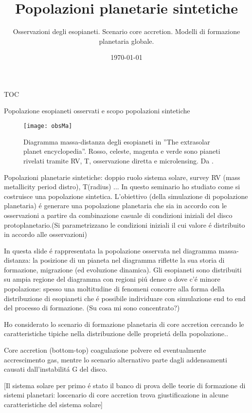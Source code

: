 \documentclass[10pt,xcolor={usenames},fleqn,serif]{beamer}
\title{Popolazioni planetarie sintetiche}
\subtitle{Osservazioni degli esopianeti. Scenario core accretion. Modelli di formazione planetaria globale.}
\date{\today}
\begin{document}
\begin{frame}
  \titlepage
\end{frame}

\begin{frame}{TOC}
\tableofcontents[onlyparts]
\end{frame}

\begin{frame}[label={intro}]{Popolazione esopianeti osservati e scopo popolazioni sintetiche}
\begin{figure}[!ht]
	\texttt{[image: obsMa]}
	\caption{Diagramma massa-distanza degli esopianeti in ''The extrasolar planet encyclopedia''. Rosso, celeste, magenta e verde sono pianeti rivelati tramite RV, T, osservazione diretta e microlensing. Da \cite{mordasini2018planetary}.}\label{fig:Maplot}
\end{figure}
\end{frame}

\begin{wordonframe}{Popolazioni planetarie sintetiche: doppio ruolo sistema solare, survey RV (mass metallicity period distro), T(radius) ...}
In questo seminario ho studiato come si costruisce una popolazione sintetica. L'obiettivo (della simulazione di popolazione planetaria) \'e generare una popolazione planetaria che sia in accordo con le osservazioni a partire da combinazione casuale di condizioni iniziali del disco protoplanetario.(Si parametrizzano le condizioni iniziali il cui valore \'e distribuito in accordo alle osservazioni)

In questa slide \'e rappresentata la popolazione osservata nel diagramma massa-distanza: la posizione di un pianeta nel diagramma riflette la sua storia di formazione, migrazione (ed evoluzione dinamica). Gli esopianeti sono distribuiti su ampia regione del diagramma con regioni pi\'u dense o dove c'\'e minore popolazione: spesso una moltitudine di fenomeni concorre alla forma della distribuzione di esopianeti che \'e possibile individuare con simulazione end to end del processo di formazione.
(Su cosa mi sono concentrato?)

Ho considerato lo scenario di formazione planetaria di core accretion cercando le caratteristiche tipiche nella distribuzione delle propriet\'a della popolazione..

Core accretion (bottom-top) coagulazione polvere ed eventualmente accrescimento gas, mentre lo scenario alternativo parte dagli addensamenti causati dall'instabilit\'a G del disco.

[Il sistema solare per primo \'e stato il banco di prova delle teorie di formazione di sistemi planetari: loscenario di core accretion trova giustificazione in alcune caratteristiche del sistema solare]

\end{wordonframe}
\end{document}
